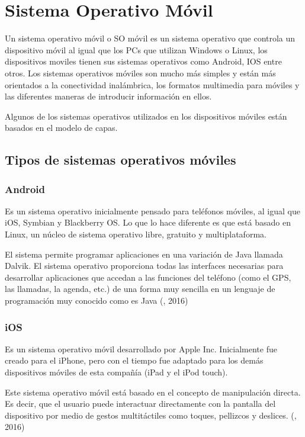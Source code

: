 \section{Sistema Operativo Móvil}	
\setlength{\parskip}{5mm}
Un sistema operativo móvil o SO móvil es un sistema operativo que controla un dispositivo móvil al igual que los PCs que utilizan Windows o Linux, los dispositivos moviles tienen sus sistemas operativos como Android, IOS entre otros. Los sistemas operativos móviles son mucho más simples y están más orientados a la conectividad inalámbrica, los formatos multimedia para móviles y las diferentes maneras de introducir información en ellos.

Algunos de los sistemas operativos utilizados en los dispositivos móviles están basados en el modelo de capas.

\setlength{\parskip}{0mm}
\subsection{Tipos de sistemas operativos móviles}

\subsubsection{Android} 
\setlength{\parskip}{5mm}
Es un sistema operativo inicialmente pensado para teléfonos móviles, al igual que iOS, Symbian y Blackberry OS. Lo que lo hace diferente es que está basado en Linux, un núcleo de sistema operativo libre, gratuito y multiplataforma.

El sistema permite programar aplicaciones en una variación de Java llamada Dalvik. El sistema operativo proporciona todas las interfaces necesarias para desarrollar aplicaciones que accedan a las funciones del teléfono (como el GPS, las llamadas, la agenda, etc.) de una forma muy sencilla en un lenguaje de programación muy conocido como es Java
\setlength{\parskip}{0mm}
(\citet{androidbib}, 2016)

\subsubsection{iOS} 
\setlength{\parskip}{5mm}
Es un sistema operativo móvil desarrollado por Apple Inc. Inicialmente fue creado para el iPhone, pero con el tiempo fue adaptado para los demás dispositivos móviles de esta compañía (iPad y el iPod touch).

Este sistema operativo móvil está basado en el concepto de manipulación directa. Es decir, que el usuario puede interactuar directamente con la pantalla del dispositivo por medio de gestos multitáctiles como toques, pellizcos y deslices.
\setlength{\parskip}{0mm}
(\citet{iosbib}, 2016)


